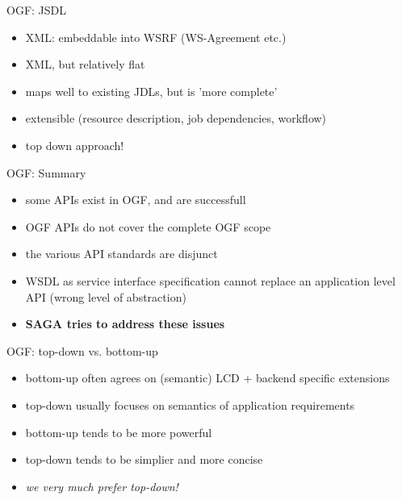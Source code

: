 \documentclass[%
  pdf,
  colorBG,
  slideColor,
  frames,
  ogf
]{prosper}
\newcommand{\I}[1]{\textit{#1}}
\newcommand{\B}[1]{\textbf{#1}}
\newcommand{\dn}{\vspace*{+1em}}
\begin{document}

 \begin{slide}{OGF: JSDL}

  \dn 

  \begin{itemize}
   \item XML: embeddable into WSRF (WS-Agreement etc.)
   \item XML, but relatively flat
   \item maps well to existing JDLs, but is 'more complete'
   \item extensible (resource description, job dependencies, workflow)
   \item top down approach!
  \end{itemize}

 \end{slide}


 \begin{slide}{OGF: Summary}

  \dn 

  \begin{itemize}
   \item some APIs exist in OGF, and are successfull
   \item OGF APIs do not cover the complete OGF scope
   \item the various API standards are disjunct
   \item WSDL as service interface specification cannot replace an application
   level API (wrong level of abstraction)
   \item \B{SAGA tries to address these issues}
  \end{itemize}

 \end{slide}


 \begin{slide}{OGF: top-down vs. bottom-up}

  \dn 

  \begin{itemize}
   \item bottom-up often agrees on (semantic) LCD + backend specific extensions
   \item top-down usually focuses on semantics of application
   requirements\\[2em]

   \item bottom-up tends to be more powerful
   \item top-down tends to be simplier and more concise\\[2em]

   \item \I{we very much prefer top-down!}
  \end{itemize}

 \end{slide}
\end{document}
